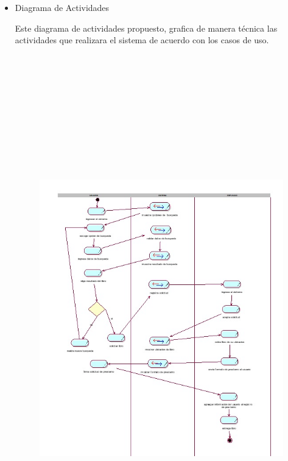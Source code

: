 \documentclass[12pt]{article}
\begin{document}
\begin{enumerate}[label*=\arabic*.]
\begin{enumerate}[label*=\arabic*.]
\begin{itemize}
\par

	\item Diagrama de Actividades \par


Este diagrama de actividades propuesto, grafica de manera técnica las actividades que realizara el sistema de acuerdo con los casos de uso.

\begin{figure}[H]
	\begin{Center}
		\includegraphics[width=5.91in,height=9in]{./media/diagrama_actividades.jpg}
	\end{Center}
\end{figure}



\end{itemize}
\end{enumerate}
\end{enumerate}
\end{document}
